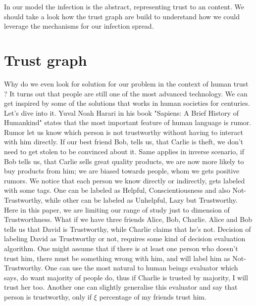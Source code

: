 \documentclass[nostrict]{szablonPG}
\begin{document}
In our model the infection is the abstract, representing trust to an content. We should take a look how the trust graph are build to understand how we could leverage the mechanisms for our infection spread.


\section{Trust graph}
\label{trust-graph}


Why do we even look for solution for our problem in the context of human trust ? It turns out that people are still one of the most advanced technology. We can get inspired by some of the solutions that works in human societies for centuries. Let's dive into it.
Yuval Noah Harari in his book "Sapiens: A Brief History of Humankind" \cite{harari2014sapiens} states that the most important feature of human language is rumor. Rumor let us know which person is not trustworthy without having to interact with him directly. If our best friend Bob, tells us, that Carlie is theft, we don't need to get stolen to be convinced about it. Same applies in inverse scenario, if Bob tells us, that Carlie sells great quality products, we are now more likely to buy products from him; we are biased towards people, whom we gets positive rumors. We notice that each person we know directly or indirectly, gets labeled with some tags. One can be labeled as Helpful, Conscientiousness and also Not-Trustworthy, while other can be labeled as Unhelpful, Lazy but Trustworthy. Here in this paper, we are limiting our range of study just to dimension of Trustworthness.
What if we have three friends Alice, Bob, Charlie. Alice and  Bob tells us that David is Trustworthy, while Charlie claims that he's not. Decision of labeling David as Trustworthy or not, requires some kind of decision evaluation algorithm.
One might assume that if there is at least one person who doesn't trust him, there must be something wrong with him, and will label him as Not-Trustworthy. One can use the most natural to human beings evaluator which says, do want majority of people do, thus if Charlie is trusted by majority, I will trust her too. Another one can slightly generalise this evaluator and say that person is trustworthy, only if $\xi$ percentage of my friends trust him. 
\end{document}
